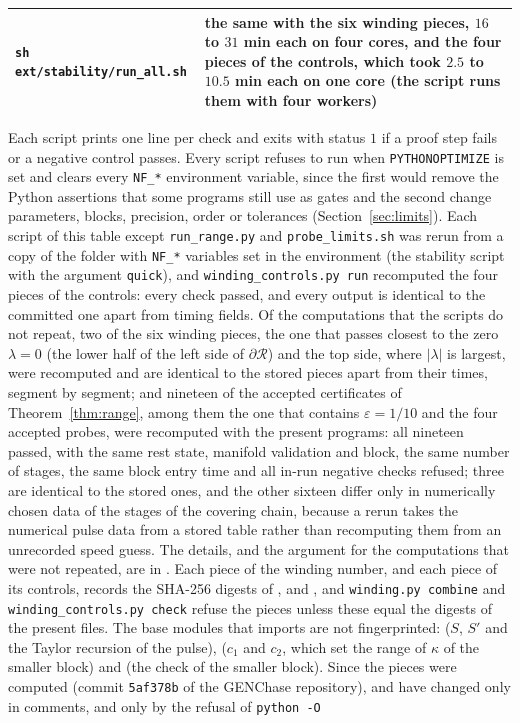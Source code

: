 \documentclass[11pt]{article}
\theoremstyle{definition}
\newcommand{\eps}{\varepsilon}
\newcommand{\Rbox}{\mathcal{R}}
\begin{document}
{\begin{longtable}{@{}>{\raggedright\arraybackslash}p{}>{\raggedright\arraybackslash}p{}@{}}
\texttt{sh ext/stability/run\_all.sh} & the same with the six winding pieces, $16$ to $31$ min each on four cores, and the four pieces of the controls, which took $2.5$ to $10.5$ min each on one core (the script runs them with four workers) \\
\bottomrule
\end{longtable}}

\medskip
Each script prints one line per check and exits with status $1$ if a proof step fails or a negative control passes. Every script refuses to run when \texttt{PYTHONOPTIMIZE} is set and clears every \texttt{NF\_*} environment variable, since the first would remove the Python assertions that some programs still use as gates and the second change parameters, blocks, precision, order or tolerances (Section~\ref{sec:limits}). Each script of this table except \texttt{run\_range.py} and \texttt{probe\_limits.sh} was rerun from a copy of the folder with \texttt{NF\_*} variables set in the environment (the stability script with the argument \texttt{quick}), and \texttt{winding\_controls.py run} recomputed the four pieces of the controls: every check passed, and every output is identical to the committed one apart from timing fields. Of the computations that the scripts do not repeat, two of the six winding pieces, the one that passes closest to the zero $\lambda = 0$ (the lower half of the left side of $\partial\Rbox$) and the top side, where $|\lambda|$ is largest, were recomputed and are identical to the stored pieces apart from their times, segment by segment; and nineteen of the accepted certificates of Theorem~\ref{thm:range}, among them the one that contains $\eps = 1/10$ and the four accepted probes, were recomputed with the present programs: all nineteen passed, with the same rest state, manifold validation and block, the same number of stages, the same block entry time and all in-run negative checks refused; three are identical to the stored ones, and the other sixteen differ only in numerically chosen data of the stages of the covering chain, because a rerun takes the numerical pulse data from a stored table rather than recomputing them from an unrecorded speed guess. The details, and the argument for the computations that were not repeated, are in . Each piece of the winding number, and each piece of its controls, records the SHA-256 digests of ,  and , and \texttt{winding.py combine} and \texttt{winding\_controls.py check} refuse the pieces unless these equal the digests of the present files. The base modules that  imports are not fingerprinted:  ($S$, $S'$ and the Taylor recursion of the pulse),  ($c_1$ and $c_2$, which set the range of $\kappa$ of the smaller block) and  (the check of the smaller block). Since the pieces were computed (commit \texttt{5af378b} of the GENChase repository),  and  have changed only in comments, and  only by the refusal of \texttt{python -O} 
\end{document}

